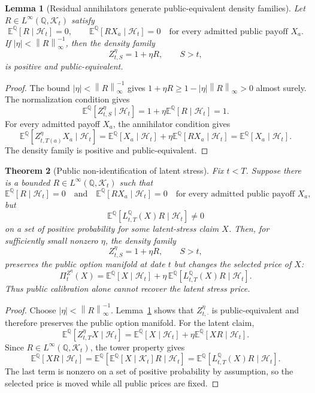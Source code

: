 \documentclass[11pt,a4paper]{amsart}
\theoremstyle{plain}
\newtheorem{theorem}{Theorem}[section]
\newtheorem{lemma}[theorem]{Lemma}
\theoremstyle{definition}
\theoremstyle{remark}
\newcommand{\QQ}{\mathbb{Q}}
\newcommand{\EE}{\mathbb{E}}
\newcommand{\cH}{\mathcal{H}}
\newcommand{\cK}{\mathcal{K}}
\newcommand{\norm}[1]{\left\lVert #1\right\rVert}
\begin{document}
\begin{lemma}[Residual annihilators generate public-equivalent density families]\label{lem:residual-annihilator}
Let \(R\in L^\infty(\QQ,\cK_t)\) satisfy
\[
        \EE^\QQ[R\mid\cH_t]=0,
        \qquad
        \EE^\QQ[RX_a\mid\cH_t]=0
        \quad\text{for every admitted public payoff }X_a .
\]
If \(|\eta|<\norm{R}_\infty^{-1}\), then the density family
\[
        Z_{t,S}^{\eta}=1+\eta R,\qquad S>t,
\]
is positive and public-equivalent.
\end{lemma}

\begin{proof}
The bound \(|\eta|<\norm{R}_\infty^{-1}\) gives
\(1+\eta R\ge 1-|\eta|\norm{R}_\infty>0\) almost surely.  The normalization condition gives
\[
        \EE^\QQ[Z_{t,S}^{\eta}\mid\cH_t]
        =
        1+\eta\EE^\QQ[R\mid\cH_t]
        =
        1.
\]
For every admitted payoff \(X_a\), the annihilator condition gives
\[
        \EE^\QQ[Z_{t,T(a)}^{\eta}X_a\mid\cH_t]
        =
        \EE^\QQ[X_a\mid\cH_t]
        +
        \eta\EE^\QQ[RX_a\mid\cH_t]
        =
        \EE^\QQ[X_a\mid\cH_t].
\]
The density family is positive and public-equivalent.
\end{proof}

\begin{theorem}[Public non-identification of latent stress]\label{thm:public-nonidentification}
Fix \(t<T\).  Suppose there is a bounded \(R\in L^\infty(\QQ,\cK_t)\) such that
\[
        \EE^\QQ[R\mid\cH_t]=0
        \quad\text{and}\quad
        \EE^\QQ[RX_a\mid\cH_t]=0
        \quad\text{for every admitted public payoff }X_a,
        \tag{A}
        \label{eq:public-annihilator}
 \]
but
\[
        \EE^\QQ[L_{t,T}^\QQ(X)R\mid\cH_t]\ne0
\]
on a set of positive probability for some latent-stress claim \(X\).  Then, for sufficiently small
nonzero \(\eta\), the density family
\[
        Z_{t,S}^\eta=1+\eta R,\qquad S>t,
\]
preserves the public option manifold at date \(t\) but changes the selected price of \(X\):
\[
        \Pi_t^{Z^\eta}(X)
        =
        \EE^\QQ[X\mid\cH_t]
        +
        \eta\,\EE^\QQ[L_{t,T}^\QQ(X)R\mid\cH_t].
\]
Thus public calibration alone cannot recover the latent stress price.
\end{theorem}

\begin{proof}
Choose \(|\eta|<\norm{R}_\infty^{-1}\).  Lemma~\ref{lem:residual-annihilator} shows that
\(Z_{t,\cdot}^{\eta}\) is public-equivalent and therefore preserves the public option manifold.
For the latent claim,
\[
        \EE^\QQ[Z_{t,T}^\eta X\mid\cH_t]
        =
        \EE^\QQ[X\mid\cH_t]
        +
        \eta\EE^\QQ[XR\mid\cH_t].
\]
Since \(R\in L^\infty(\QQ,\cK_t)\), the tower property gives
\[
        \EE^\QQ[XR\mid\cH_t]
        =
        \EE^\QQ[\EE^\QQ[X\mid\cK_t]R\mid\cH_t]
        =
        \EE^\QQ[L_{t,T}^\QQ(X)R\mid\cH_t].
\]
The last term is nonzero on a set of positive probability by assumption, so the selected price is
moved while all public prices are fixed.
\end{proof}
\end{document}
